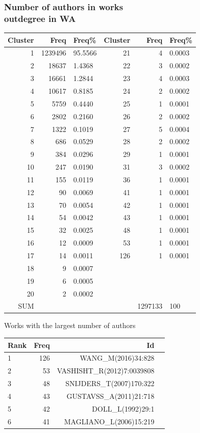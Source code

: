\documentclass[hyperref={pdfstartview={FitBH -32768},
                         pdfpagemode=FullScreen,
                         plainpages=false,
                         colorlinks=true}
              ]{beamer}
\begin{document}
\begin{frame}[fragile]
\frametitle{Number of authors in works \label{numpap}\\ \normalsize outdegree in WA}
\renewcommand{\arraystretch}{0.82}
\tiny
\begin{tabular}{r|r|l||r|r|l}
Cluster&  	Freq&  	Freq\% &  	Cluster&   Freq &	Freq\%\\ \hline   
1&  	1239496&  	95.5566&  	21&  	4&  	0.0003\\
2&  	18637&  	1.4368&  	22&  	3&  	0.0002\\
3&  	16661&  	1.2844&  	23&  	4&  	0.0003\\
4&  	10617&  	0.8185&  	24&  	2&  	0.0002\\
5&  	5759&  	0.4440&  	25&  	1&  	0.0001\\
6&  	2802&  	0.2160&  	26&  	2&  	0.0002\\
7&  	1322&  	0.1019&  	27&  	5&  	0.0004\\
8&  	686&  	0.0529&  	28&  	2&  	0.0002\\
9&  	384&  	0.0296&  	29&  	1&  	0.0001\\
10&  	247&  	0.0190&  	31&  	3&  	0.0002\\
11&  	155&  	0.0119&  	36&  	1&  	0.0001\\
12&  	90&  	0.0069&  	41&  	1&  	0.0001\\
13&  	70&  	0.0054&  	42&  	1&  	0.0001\\
14&  	54&  	0.0042&  	43&  	1&  	0.0001\\
15&  	32&  	0.0025&  	48&  	1&  	0.0001\\
16&  	12&  	0.0009&  	53&  	1&  	0.0001\\
17&  	14&  	0.0011&  	126&  	1&  	0.0001\\
18&  	9&  	0.0007&  	  & 	 & 	\\
19&  	6&  	0.0005&  	 &	 &	\\
20&  	2&  	0.0002&  	&	 &	\\ 
SUM &     &              &       &  1297133 & 100  \\ \hline   
\end{tabular}
\medskip

Works with the largest number of authors
\medskip

\renewcommand{\arraystretch}{0.82}
\begin{tabular}{l|r|r|r|}
     Rank    & Freq & Id \\ \hline
         1   & 126  & WANG\_M(2016)34:828 \\
         2    & 53   & VASHISHT\_R(2012)7:0039808 \\ 
         3      & 48  & SNIJDERS\_T(2007)170:322 \\ 
         4     & 43  & GUSTAVSS\_A(2011)21:718  \\ 
         5    & 42   & DOLL\_L(1992)29:1 \\ 
         6   &41 &  MAGLIANO\_L(2006)15:219 \\ \hline
\end{tabular}

\end{frame}
\end{document}
